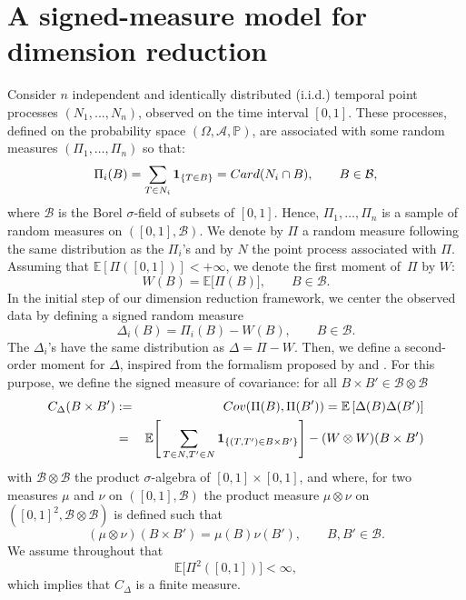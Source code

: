 \documentclass[aos]{imsart}
\theoremstyle{plain}
\theoremstyle{remark}
\newcommand{\1}{1}
\begin{document}
\section{A signed-measure model for dimension reduction}\label{sec:setting}
Consider $n$ independent and identically distributed (i.i.d.) temporal point processes $(N_1, \ldots, N_n)$,  observed on the time interval $[0,1]$. These processes, defined on the probability space $(\Omega,\mathcal A,\mathbb P)$, are associated with some random measures $(\Pi_1,\hdots,\Pi_n)$ so that:
\[
\Pi_i(B)= \sum_{T \in N_i} \mathbf 1_{\{T\in B\}}  = {\rm Card}(N_i\cap B), \qquad B\in\mathcal B,
\]
where $\mathcal B$ is the Borel $\sigma$-field of subsets of $[0,1]$. Hence, $\Pi_1,\hdots,\Pi_n$ is a sample of random measures on $([0,1],\mathcal B)$. We denote by $\Pi$ a random measure following the same distribution as the $\Pi_i$'s and by $N$ the point process associated with $\Pi$. Assuming that $\mathbb E[\Pi([0,1])]<+\infty$, we denote the first moment of~$\Pi$ by $W$:
\[
W(B)=	\mathbb{E} \big[\Pi(B)\big],\qquad B\in\mathcal B.
\]
In the initial step of our dimension reduction framework, we center the observed data by defining a signed random measure 
$$\Delta_i(B) = \Pi_i(B)-W(B),\qquad B\in\mathcal B.$$
The $\Delta_i$'s have the same distribution as $\Delta=\Pi-W$.
Then, we define a second-order moment for $\Delta$, inspired from the formalism proposed by \cite{PZ16} and \cite{Carrizo22}. For this purpose, we define the signed measure of covariance: for all $B\times B'\in\mathcal B\otimes\mathcal B$
\begin{eqnarray*}
C_\Delta(B\times B')& :=& {\rm Cov}(\Pi(B),\Pi(B')) 
                               = \mathbb E \left[  \Delta(B)\Delta(B') \right] \\
                               &=& \mathbb E\Bigg[\sum_{T\in N,T'\in N}\mathbf 1_{\{(T,T')\in B\times B'\}}\Bigg]-( W \otimes W)(B\times B') 
\end{eqnarray*}
with $\mathcal B\otimes\mathcal B$ the product $\sigma$-algebra of $[0,1]\times[0,1]$, and where, for two measures $\mu$ and $\nu$ on $([0,1],\mathcal B)$ the product measure $\mu\otimes\nu$ on $([0,1]^2,\mathcal B\otimes \mathcal B)$ is defined such that \[
(\mu\otimes\nu)(B\times B') = \mu(B)\nu(B'), \qquad B,B'\in\mathcal B.
\]
We assume throughout that
\begin{equation}\label{eq:hyp2}
	\mathbb E\Big[\Pi^2([0,1])\Big]<\infty, 
\end{equation}
which implies that $C_\Delta$ is a finite measure. 
	
\end{document}
